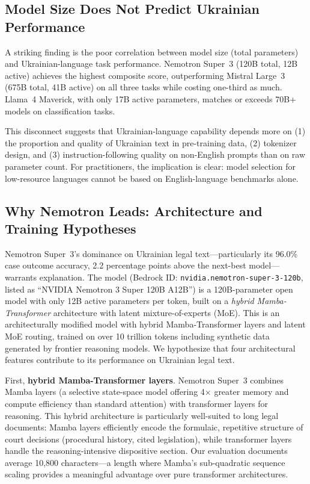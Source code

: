\documentclass[11pt,a4paper]{article}
\begin{document}
\subsection{Model Size Does Not Predict Ukrainian Performance}

A striking finding is the poor correlation between model size (total parameters) and Ukrainian-language task performance. Nemotron Super~3 (120B total, 12B active) achieves the highest composite score, outperforming Mistral Large~3 (675B total, 41B active) on all three tasks while costing one-third as much. Llama~4 Maverick, with only 17B active parameters, matches or exceeds 70B+ models on classification tasks.

This disconnect suggests that Ukrainian-language capability depends more on (1) the proportion and quality of Ukrainian text in pre-training data, (2) tokenizer design, and (3) instruction-following quality on non-English prompts than on raw parameter count. For practitioners, the implication is clear: model selection for low-resource languages cannot be based on English-language benchmarks alone.

\subsection{Why Nemotron Leads: Architecture and Training Hypotheses}

Nemotron Super~3's dominance on Ukrainian legal text---particularly its 96.0\% case outcome accuracy, 2.2 percentage points above the next-best model---warrants explanation. The model (Bedrock ID: \texttt{nvidia.nemotron-super-3-120b}, listed as ``NVIDIA Nemotron 3 Super 120B A12B'') is a 120B-parameter open model with only 12B active parameters per token, built on a \emph{hybrid Mamba-Transformer} architecture with latent mixture-of-experts (MoE). This is an architecturally modified model with hybrid Mamba-Transformer layers and latent MoE routing, trained on over 10 trillion tokens including synthetic data generated by frontier reasoning models. We hypothesize that four architectural features contribute to its performance on Ukrainian legal text.

First, \textbf{hybrid Mamba-Transformer layers}. Nemotron Super~3 combines Mamba layers (a selective state-space model offering 4$\times$ greater memory and compute efficiency than standard attention) with transformer layers for reasoning. This hybrid architecture is particularly well-suited to long legal documents: Mamba layers efficiently encode the formulaic, repetitive structure of court decisions (procedural history, cited legislation), while transformer layers handle the reasoning-intensive dispositive section. Our evaluation documents average 10,800 characters---a length where Mamba's sub-quadratic sequence scaling provides a meaningful advantage over pure transformer architectures.
\end{document}
